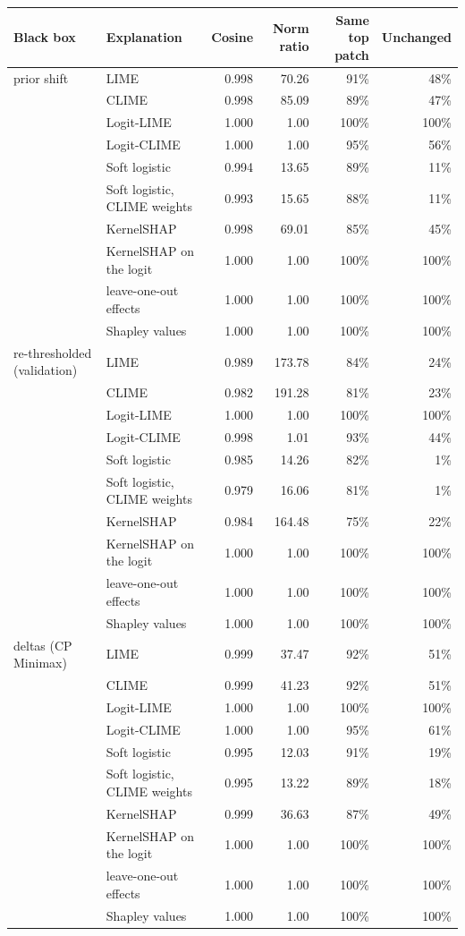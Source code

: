 \begin{tabular}{@{}llrrrr@{}}
  \toprule
  Black box & Explanation & Cosine & Norm ratio & Same top patch & Unchanged \\
  \midrule
  prior shift & LIME & 0.998 & 70.26 & 91\% & 48\% \\
   & CLIME & 0.998 & 85.09 & 89\% & 47\% \\
   & Logit-LIME & 1.000 & 1.00 & 100\% & 100\% \\
   & Logit-CLIME & 1.000 & 1.00 & 95\% & 56\% \\
   & Soft logistic & 0.994 & 13.65 & 89\% & 11\% \\
   & Soft logistic, CLIME weights & 0.993 & 15.65 & 88\% & 11\% \\
   & KernelSHAP & 0.998 & 69.01 & 85\% & 45\% \\
   & KernelSHAP on the logit & 1.000 & 1.00 & 100\% & 100\% \\
   & leave-one-out effects & 1.000 & 1.00 & 100\% & 100\% \\
   & Shapley values & 1.000 & 1.00 & 100\% & 100\% \\
  \midrule
  re-thresholded (validation) & LIME & 0.989 & 173.78 & 84\% & 24\% \\
   & CLIME & 0.982 & 191.28 & 81\% & 23\% \\
   & Logit-LIME & 1.000 & 1.00 & 100\% & 100\% \\
   & Logit-CLIME & 0.998 & 1.01 & 93\% & 44\% \\
   & Soft logistic & 0.985 & 14.26 & 82\% & 1\% \\
   & Soft logistic, CLIME weights & 0.979 & 16.06 & 81\% & 1\% \\
   & KernelSHAP & 0.984 & 164.48 & 75\% & 22\% \\
   & KernelSHAP on the logit & 1.000 & 1.00 & 100\% & 100\% \\
   & leave-one-out effects & 1.000 & 1.00 & 100\% & 100\% \\
   & Shapley values & 1.000 & 1.00 & 100\% & 100\% \\
  \midrule
  deltas (CP Minimax) & LIME & 0.999 & 37.47 & 92\% & 51\% \\
   & CLIME & 0.999 & 41.23 & 92\% & 51\% \\
   & Logit-LIME & 1.000 & 1.00 & 100\% & 100\% \\
   & Logit-CLIME & 1.000 & 1.00 & 95\% & 61\% \\
   & Soft logistic & 0.995 & 12.03 & 91\% & 19\% \\
   & Soft logistic, CLIME weights & 0.995 & 13.22 & 89\% & 18\% \\
   & KernelSHAP & 0.999 & 36.63 & 87\% & 49\% \\
   & KernelSHAP on the logit & 1.000 & 1.00 & 100\% & 100\% \\
   & leave-one-out effects & 1.000 & 1.00 & 100\% & 100\% \\
   & Shapley values & 1.000 & 1.00 & 100\% & 100\% \\
  \bottomrule
\end{tabular}
